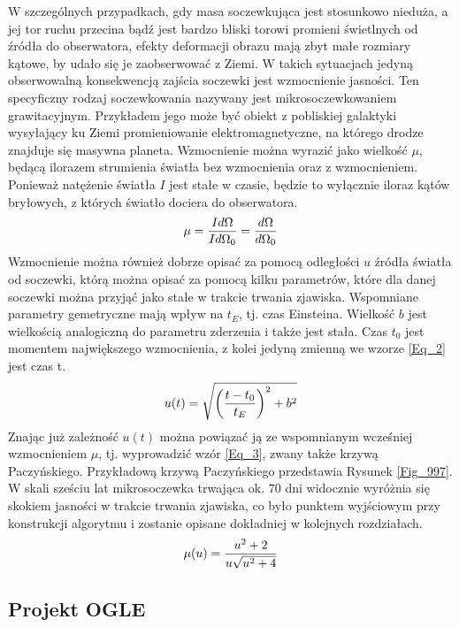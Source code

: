 \documentclass[a4paper,11pt]{article}
\newcommand{\ak}{\hspace{1.0cm}}
\begin{document}
\ak W szczególnych przypadkach, gdy masa soczewkująca jest stosunkowo nieduża, a jej tor ruchu przecina bądź jest bardzo bliski torowi promieni świetlnych od źródła do obserwatora, efekty deformacji obrazu mają zbyt małe rozmiary kątowe, by udało się je zaobserwować z Ziemi. W takich sytuacjach jedyną obserwowalną konsekwencją zajścia soczewki jest wzmocnienie jasności. Ten specyficzny rodzaj soczewkowania nazywany jest mikrosoczewkowaniem grawitacyjnym. Przykładem jego może być obiekt z pobliskiej galaktyki wysyłający ku Ziemi promieniowanie elektromagnetyczne, na którego drodze znajduje się masywna planeta. Wzmocnienie można wyrazić jako wielkość $\mu$, będącą ilorazem strumienia światła bez wzmocnienia oraz z wzmocnieniem. Ponieważ natężenie światła $I$ jest stałe w czasie, będzie to wyłącznie iloraz kątów bryłowych, z których światło dociera do  obserwatora.\\
\begin{equation}
\centering
\mu=\frac{Id\Omega}{Id\Omega_{0}}=\frac{d\Omega}{d\Omega_{0}}
\label{Eq_1}
\end{equation}
\flushleft
\ak Wzmocnienie można również dobrze opisać za pomocą odległości $u$ źródła światła od soczewki, którą można opisać za pomocą kilku parametrów, które dla danej soczewki można przyjąć jako stałe w trakcie trwania zjawiska. Wspomniane parametry gemetryczne mają wpływ na $t_{E}$, tj. czas Einsteina. Wielkość $b$ jest wielkością analogiczną do parametru zderzenia i także jest stała. Czas $t_{0}$ jest momentem największego wzmocnienia, z kolei jedyną zmienną we wzorze \ref{Eq_2} jest czas {t}.
\begin{equation}
\centering
u(t)=\sqrt{\left(\frac{t-t_{0}}{t_{E}}\right)^{2}+b^{2}}
\label{Eq_2}
\end{equation}
\ak Znając już zależność $u(t)$ można powiązać ją ze wspomnianym wcześniej wzmocnieniem $\mu$, tj. wyprowadzić wzór \ref{Eq_3}, zwany także krzywą Paczyńskiego. Przykładową krzywą Paczyńskiego przedstawia Rysunek \ref{Fig_997}. %
W skali sześciu lat mikrosoczewka trwająca ok. $70$ dni widocznie wyróżnia się skokiem jasności w trakcie trwania zjawiska, co było punktem wyjściowym przy konstrukcji algorytmu i zostanie opisane dokładniej w kolejnych rozdziałach.
\begin{equation}
\centering
\mu(u)=\frac{u^{2}+2}{u\sqrt{u^{2}+4}}
\label{Eq_3}
\end{equation}
\flushleft
\subsection{Projekt OGLE}
\end{document}
